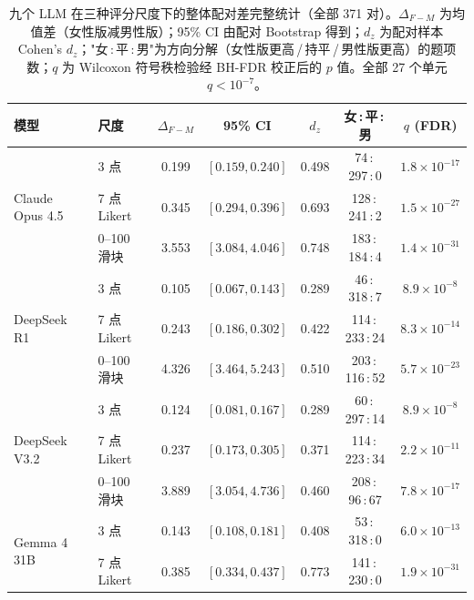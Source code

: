 \documentclass[UTF8,12pt]{ctexart}
\begin{document}
\begin{table}[htbp]
    \centering
    \caption{九个 LLM 在三种评分尺度下的整体配对差完整统计（全部 371 对）。\(\Delta_{F-M}\) 为均值差（女性版减男性版）；95\% CI 由配对 Bootstrap 得到；\(d_z\) 为配对样本 Cohen's $d_z$；"女\,:\,平\,:\,男"为方向分解（女性版更高\,/\,持平\,/\,男性版更高）的题项数；$q$ 为 Wilcoxon 符号秩检验经 BH-FDR 校正后的 $p$ 值。全部 27 个单元 $q < 10^{-7}$。}
    \label{tab:1b-overall}
    \footnotesize
    \setlength{\tabcolsep}{4pt}
    \begin{tabular}{llccccc}
        \toprule
        模型 & 尺度 & $\Delta_{F-M}$ & 95\% CI & $d_z$ & 女\,:\,平\,:\,男 & $q$ (FDR) \\
        \midrule
        \multirow{3}{*}{Claude Opus 4.5}
            & 3 点        & 0.199 & $[0.159, 0.240]$ & 0.498 & 74\,:\,297\,:\,0    & $1.8\!\times\!10^{-17}$ \\
            & 7 点 Likert & 0.345 & $[0.294, 0.396]$ & 0.693 & 128\,:\,241\,:\,2   & $1.5\!\times\!10^{-27}$ \\
            & 0--100 滑块 & 3.553 & $[3.084, 4.046]$ & 0.748 & 183\,:\,184\,:\,4   & $1.4\!\times\!10^{-31}$ \\
        \midrule
        \multirow{3}{*}{DeepSeek R1}
            & 3 点        & 0.105 & $[0.067, 0.143]$ & 0.289 & 46\,:\,318\,:\,7    & $8.9\!\times\!10^{-8}$  \\
            & 7 点 Likert & 0.243 & $[0.186, 0.302]$ & 0.422 & 114\,:\,233\,:\,24  & $8.3\!\times\!10^{-14}$ \\
            & 0--100 滑块 & 4.326 & $[3.464, 5.243]$ & 0.510 & 203\,:\,116\,:\,52  & $5.7\!\times\!10^{-23}$ \\
        \midrule
        \multirow{3}{*}{DeepSeek V3.2}
            & 3 点        & 0.124 & $[0.081, 0.167]$ & 0.289 & 60\,:\,297\,:\,14   & $8.9\!\times\!10^{-8}$  \\
            & 7 点 Likert & 0.237 & $[0.173, 0.305]$ & 0.371 & 114\,:\,223\,:\,34  & $2.2\!\times\!10^{-11}$ \\
            & 0--100 滑块 & 3.889 & $[3.054, 4.736]$ & 0.460 & 208\,:\,96\,:\,67   & $7.8\!\times\!10^{-17}$ \\
        \midrule
        \multirow{3}{*}{Gemma 4 31B}
            & 3 点        & 0.143 & $[0.108, 0.181]$ & 0.408 & 53\,:\,318\,:\,0    & $6.0\!\times\!10^{-13}$ \\
            & 7 点 Likert & 0.385 & $[0.334, 0.437]$ & 0.773 & 141\,:\,230\,:\,0   & $1.9\!\times\!10^{-31}$ \\

\end{tabular}
\end{table}
\end{document}
